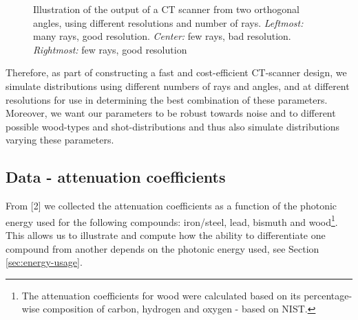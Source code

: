 \documentclass{article}
\begin{document}
\begin{figure}[htbp]
    \captionsetup{justification=centering}
    \caption[]{\small Illustration of the output of a CT scanner from two orthogonal angles, using different resolutions and number of rays. \emph{Leftmost:} many rays, good resolution. \emph{Center:} few rays, bad resolution. \emph{Rightmost:} few rays, good resolution}
    \label{fig:tikz-pictures}
\end{figure} 
\noindent Therefore, as part of constructing a fast and cost-efficient CT-scanner design, we simulate distributions using different numbers of rays and angles, and at different resolutions for use in determining the best combination of these parameters. Moreover, we want our parameters to be robust towards noise and to different possible wood-types and shot-distributions and thus also simulate distributions varying these parameters.

\subsection{Data - attenuation coefficients} \label{NISTDATA}
From [2] we collected the attenuation coefficients as a function of the photonic energy used for the following compounds: iron/steel, lead, bismuth and wood\footnote{The attenuation coefficients for wood were calculated based on its percentage-wise composition of carbon, hydrogen and oxygen - based on NIST.}. This allows us to illustrate and compute how the ability to differentiate one compound from another depends on the photonic energy used, see Section \ref{sec:energy-usage}.

\end{document}
